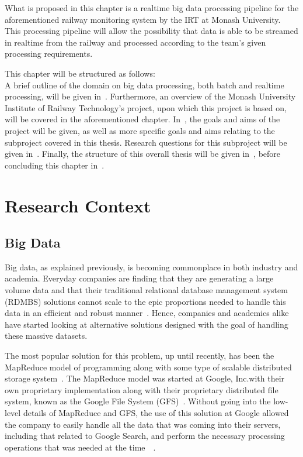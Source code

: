 What is proposed in this chapter is a realtime big data processing pipeline for the aforementioned railway monitoring
system by the IRT at Monash University. This processing pipeline will allow the possibility that data is able to be
streamed in realtime from the railway and processed according to the team's given processing requirements.

This chapter will be structured as follows:\\
A brief outline of the domain on big data processing, both batch and realtime processing, will be given
in~. Furthermore, an overview of the Monash University Institute of Railway Technology's
project, upon which this project is based on, will be covered in the aforementioned chapter. In~,
the goals and aims of the project will be given, as well as more specific goals and aims relating to the subproject
covered in this thesis. Research questions for this subproject will be given in~.
Finally, the structure of this overall thesis will be given in~, before
concluding this chapter in~.




\section{Research Context} %
\label{sec:research_context}

\subsection{Big Data} %
\label{sub:big_data}

Big data, as explained previously, is becoming commonplace in both industry and academia. Everyday companies are finding
that they are generating a large volume data and that their traditional relational database management system (RDMBS) solutions cannot
scale to the epic proportions needed to handle this data in an efficient and robust manner~\cite{marz2013principles}.
Hence, companies and academics alike have started looking at alternative solutions designed with the goal of handling
these massive datasets.

The most popular solution for this problem, up until recently, has been the MapReduce %
 model of programming along with
some type of scalable distributed storage system~\cite{bifet_mining_2013}. The MapReduce model was started at Google,
Inc.\@ with their own proprietary implementation along with their proprietary distributed file system, known as the Google
File System (GFS)~\cite{ghemawat_google_2003}. Without going into the low-level details of MapReduce and GFS, the use of this solution at Google
allowed the company to easily handle all the data that was coming into their servers, including that related to Google Search, and perform the necessary
processing operations that was needed at the time~\cite{ghemawat_google_2003}~\cite{dean_mapreduce:_2008}.

